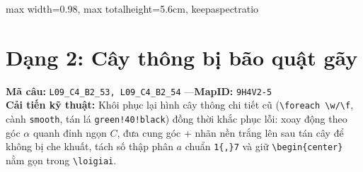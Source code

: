 \documentclass[10pt,a4paper]{article}
\begin{document}
\begin{minipage}[t]{0.54\textwidth}
\begin{tcolorbox}[colback=green!4!white,colframe=green!60!black,title={\textbf{HÌNH MỚI (Chuẩn hóa \& Đổi số động)}},top=2mm,bottom=2mm,left=2mm,right=2mm]
\begin{center}
\begin{adjustbox}{max width=0.98\linewidth, max totalheight=5.6cm, keepaspectratio}
\end{adjustbox}
\end{center}
\end{tcolorbox}
\end{minipage}
\newpage


\section{Dạng 2: Cây thông bị bão quật gãy}
\noindent\textbf{Mã câu:} \texttt{L09\_C4\_B2\_53, L09\_C4\_B2\_54} \quad---\quad \textbf{MapID:} \texttt{9H4V2-5}\\[2mm]
\textbf{Cải tiến kỹ thuật:} Khôi phục lại hình cây thông chi tiết cũ (\texttt{\textbackslash foreach \textbackslash w/\textbackslash f}, cành \texttt{smooth}, tán lá \texttt{green!40!black}) đồng thời khắc phục lỗi: xoay động theo góc $\alpha$ quanh đỉnh ngọn $C$, đưa cung góc + nhãn nền trắng lên sau tán cây để không bị che khuất, tách số thập phân $a$ chuẩn \texttt{1\{,\}7} và giữ \texttt{\textbackslash begin\{center\}} nằm gọn trong \texttt{\textbackslash loigiai}.\\[3mm]
\noindent
\end{document}
